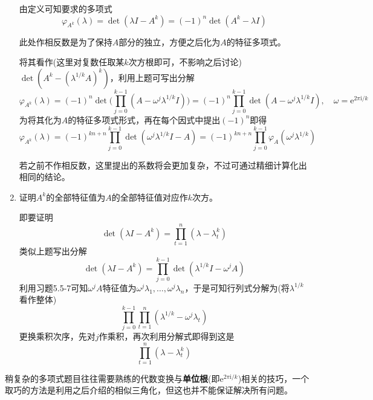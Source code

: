 \documentclass[a4paper,UTF8,fontset=windows]{ctexart}
\newcommand*{\note}{\noindent *}
\begin{document}
\begin{enumerate}
    由定义可知要求的多项式
    $$\varphi_{A^k}(\lambda)=\det(\lambda I-A^k)=(-1)^n\det(A^k-\lambda I)$$

    \note 此处作相反数是为了保持$A$部分的独立，方便之后化为$A$的特征多项式。

    将其看作(这里对复数任取某$k$次方根即可，不影响之后讨论)\ $\det(A^k-(\lambda^{1/k}A)^{k})$，利用上题可写出分解
    $$\varphi_{A^k}(\lambda)=(-1)^n\det\bigg(\prod_{j=0}^{k-1}(A-\omega^j\lambda^{1/k}I)\bigg)=(-1)^n\prod_{j=0}^{k-1}\det(A-\omega^j\lambda^{1/k}I),\quad\omega=\mathrm{e}^{2\pi\mathrm{i}/k}$$
    为将其化为$A$的特征多项式形式，再在每个因式中提出$(-1)^n$即得
    $$\varphi_{A^k}(\lambda)=(-1)^{kn+n}\prod_{j=0}^{k-1}\det(\omega^j\lambda^{1/k}I-A)=(-1)^{kn+n}\prod_{j=0}^{k-1}\varphi_A(\omega^j\lambda^{1/k})$$

    \note 若之前不作相反数，这里提出的系数将会更加复杂，不过可通过精细计算化出相同的结论。

    \item 证明$A^k$的全部特征值为$A$的全部特征值对应作$k$次方。
    
    即要证明
    $$\det(\lambda I-A^k)=\prod_{t=1}^n(\lambda-\lambda_t^k)$$
    类似上题写出分解
    $$\det(\lambda I-A^k)=\prod_{j=0}^{k-1}\det(\lambda^{1/k}I-\omega^jA)$$
    利用习题5.5-7可知$\omega^jA$特征值为$\omega^j\lambda_1,\dots,\omega^j\lambda_n$，于是可知行列式分解为(将$\lambda^{1/k}$看作整体)
    $$\prod_{j=0}^{k-1}\prod_{t=1}^n(\lambda^{1/k}-\omega^j\lambda_t)$$
    更换乘积次序，先对$j$作乘积，再次利用分解式即得到这是
    $$\prod_{t=1}^n(\lambda-\lambda_t^k)$$
\end{enumerate}

\note 稍复杂的多项式题目往往需要熟练的代数变换与\textbf{单位根}(即$\mathrm{e}^{2\pi\mathrm{i}/k}$)相关的技巧，一个取巧的方法是利用之后介绍的相似三角化，但这也并不能保证解决所有问题。
\end{document}
